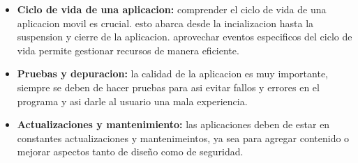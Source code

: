 \documentclass{article}
\begin{document}
\begin{itemize}
    \item \textbf{Ciclo de vida de una aplicacion:} comprender el ciclo de vida de una aplicacion movil es crucial. esto abarca desde la incializacion hasta la suspension y cierre de la aplicacion. aprovechar eventos especificos del ciclo de vida permite gestionar recursos de manera eficiente. 

    \item \textbf{Pruebas y depuracion:} la calidad de la aplicacion es muy importante, siempre se deben de hacer pruebas para asi evitar fallos y errores en el programa y asi darle al usuario una mala experiencia.
    
    \item \textbf{Actualizaciones y mantenimiento:} las aplicaciones deben de estar en constantes actualizaciones y mantenimeintos, ya sea para agregar contenido o mejorar aspectos tanto de diseño como de seguridad.
\end{itemize}
\end{document}
